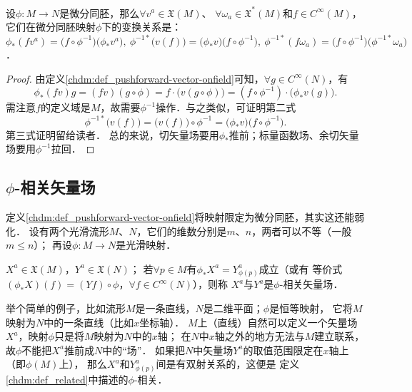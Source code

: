 \begin{proposition}\label{chdm:thm_fxxf}
    设$\phi:M\to N$是微分同胚，那么$\forall v^a \in\mathfrak{X}(M)$、
    $\forall \omega_a \in\mathfrak{X}^{*}(M)$和$f\in C^\infty(M)$，
    它们在微分同胚映射$\phi$下的变换关系是：
    $    \phi_{*} (f v^a) = \bigl(f\circ\phi^{-1}\bigr) \bigl( \phi_{*} v^a \bigr), \
        \phi^{-1*} \bigl(v(f)\bigr) = \bigl( \phi_{*} v \bigr)
        \bigl(f\circ\phi^{-1}\bigr), \
        \phi^{-1*}(f \omega_a) = \bigl(f\circ\phi^{-1}\bigr)\bigl(\phi^{-1*}\omega_a\bigr) 
    $．
\end{proposition}
\begin{proof}
    由定义\ref{chdm:def_pushforward-vector-onfield}可知，$\forall g\in C^\infty(N)$，有
    \begin{equation}
        \phi_{*} (f v) g = (f v)(g\circ \phi) =f\cdot \bigl(v(g\circ \phi)\bigr)
        =(f\circ \phi^{-1})\cdot \bigl(\phi_{*} v(g)\bigr).
    \end{equation}
    需注意$f$的定义域是$M$，故需要$\phi^{-1}$操作．与之类似，可证明第二式
    \begin{equation}
        \phi^{-1*} \bigl(v(f)\bigr) = \bigl(v(f)\bigr) \circ \phi^{-1}
        =\bigl( \phi_{*} v \bigr)  \bigl(f\circ\phi^{-1}\bigr) .
    \end{equation}
    第三式证明留给读者．
    总的来说，切矢量场要用$\phi_{*}$推前；标量函数场、余切矢量场要用$\phi^{-1}$拉回．
\end{proof}


\subsection{$\phi$-相关矢量场}\label{chdm:sec_related}
定义\ref{chdm:def_pushforward-vector-onfield}将映射限定为微分同胚，其实这还能弱化．
设有两个光滑流形$M$、$N$，它们的维数分别是$m$、$n$，两者可以不等（一般$m\leqslant n$）；
再设$\phi:M\to N$是光滑映射． %
\begin{definition}\label{chdm:def_related}
    $X^a\in \mathfrak{X}(M)$，$Y^a\in \mathfrak{X}(N)$；
    若$\forall p\in M$有$\phi_{*} X^a = Y^a_{\phi(p)}$成立（或有
    等价式$(\phi_{*}X)(f)= (Yf)\circ\phi$，$\forall f\in C^\infty(N)$），则称
    $X^a$与$Y^a$是$\phi$-{\heiti 相关矢量场}．
\end{definition}
举个简单的例子，比如流形$M$是一条直线，$N$是二维平面；$\phi$是恒等映射，
它将$M$映射为$N$中的一条直线（比如$x$坐标轴）．
$M$上（直线）自然可以定义一个矢量场$X^a$，映射$\phi$只是将$M$映射为$N$中的$x$轴；
在$N$中$x$轴之外的地方无法与$M$建立联系，故$\phi$不能把$X^a$推前成$N$中的“场”．
如果把$N$中矢量场$Y^a$的取值范围限定在$x$轴上（即$\phi(M)$上），
那么$X^a$和$Y^a_{\phi(p)}$间是有双射关系的，这便是
定义\ref{chdm:def_related}中描述的$\phi$-相关．

